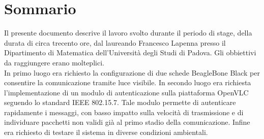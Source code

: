 \cleardoublepage
{}
{}
\begingroup
\let\clearpage\relax
\let\cleardoublepage\relax
\let\cleardoublepage\relax

\chapter*{Sommario}

Il presente documento descrive il lavoro svolto durante il periodo di stage, della durata di circa trecento ore, dal laureando Francesco Lapenna presso il Dipartimento di Matematica dell'Università degli Studi di Padova.
Gli obbiettivi da raggiungere erano molteplici.\\
In primo luogo era richiesto la configurazione di due schede BeagleBone Black per consentire la comunicazione tramite luce visibile.
In secondo luogo era richiesta l'implementazione di un modulo di autenticazione sulla piattaforma OpenVLC seguendo lo standard IEEE 802.15.7.
Tale modulo permette di autenticare rapidamente i messaggi, con basso impatto sulla velocità di trasmissione e di individuare pacchetti non validi già al primo stadio della comunicazione.
Infine era richiesto di testare il sistema in diverse condizioni ambientali.




\endgroup

\vfill
